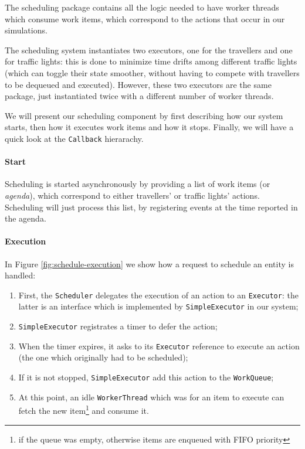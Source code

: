 The scheduling package contains all the logic needed to have worker threads
which consume work items, which correspond to the actions that occur in our
simulations.

The scheduling system instantiates two executors, one for the travellers and
one for traffic lights: this is done to minimize time drifts among different
traffic lights (which can toggle their state smoother, without having to
compete with travellers to be dequeued and executed).
However, these two executors are the same package, just instantiated twice with
a different number of worker threads.

We will present our scheduling component by first describing how our system
starts, then how it executes work items and how it stops.
Finally, we will have a quick look at the \texttt{Callback} hierarachy.

\paragraph{Start}

Scheduling is started asynchronously by providing a list of work items
(or \textit{agenda}), which correspond to either travellers' or traffic
lights' actions.
Scheduling will just process this list, by registering events at the time
reported in the agenda.

\paragraph{Execution}

In Figure \ref{fig:schedule-execution} we show how a request to schedule an
entity is handled:

\begin{enumerate}
  \item First, the \texttt{Scheduler} delegates the execution of an action to
    an \texttt{Executor}: the latter is an interface which is implemented by
    \texttt{SimpleExecutor} in our system;
  \item \texttt{SimpleExecutor} registrates a timer to defer the action;
  \item When the timer expires, it asks to its \texttt{Executor} reference to
    execute an action (the one which originally had to be scheduled);
  \item If it is not stopped, \texttt{SimpleExecutor} add this action to the
    \texttt{WorkQueue};
  \item At this point, an idle \texttt{WorkerThread} which was for an item to
    execute can fetch the new item\footnote{if the queue was empty, otherwise
    items are enqueued with FIFO priority} and consume it.
\end{enumerate}

